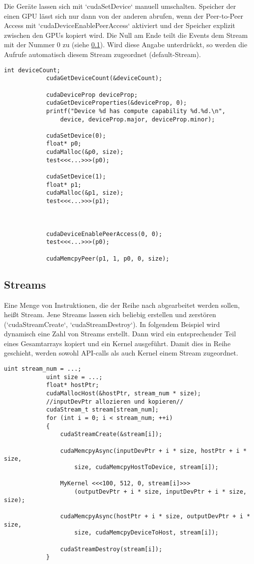 		Die Geräte lassen sich mit \li`cudaSetDevice` manuell umschalten. Speicher der einen GPU lässt sich nur dann von der anderen abrufen, wenn der Peer-to-Peer Access mit \li`cudaDeviceEnablePeerAccess` aktiviert und der Speicher explizit zwischen den GPUs kopiert wird. Die Null am Ende teilt die Events dem Stream mit der Nummer 0 zu (siehe \ref{streams}). Wird diese Angabe unterdrückt, so werden die Aufrufe automatisch diesem \Gls{Stream} zugeordnet (default-\Gls{Stream}).
		\begin{lstlisting}[caption=~Device Peer-to-Peer Access]
			int deviceCount;
			cudaGetDeviceCount(&deviceCount);

			cudaDeviceProp deviceProp;
			cudaGetDeviceProperties(&deviceProp, 0);
			printf("Device %d has compute capability %d.%d.\n",
    			device, deviceProp.major, deviceProp.minor);
           
			cudaSetDevice(0);
			float* p0;
			cudaMalloc(&p0, size);
			test<<<...>>>(p0);
			
			cudaSetDevice(1);
			float* p1;
			cudaMalloc(&p1, size);
			test<<<...>>>(p1);
			
			
			
			cudaDeviceEnablePeerAccess(0, 0);
			test<<<...>>>(p0);
			
			cudaMemcpyPeer(p1, 1, p0, 0, size);
		\end{lstlisting}

	
		\subsection{Streams}\label{streams}
		Eine Menge von Instruktionen, die der Reihe nach abgearbeitet werden sollen, heißt \Gls{Stream}. Jene \Glspl{Stream} lassen sich beliebig erstellen und zerstören (\li`cudaStreamCreate`, \li`cudaStreamDestroy`). In folgendem Beispiel wird dynamisch eine Zahl von \Glspl{Stream} erstellt. Dann wird ein entsprechender Teil eines Gesamtarrays kopiert und ein Kernel ausgeführt. Damit dies in Reihe geschieht, werden sowohl \Gls{API}-calls als auch \Gls{Kernel} einem \Gls{Stream} zugeordnet.	
		
		\newpage
		
		\begin{lstlisting}[caption=~Streams]
			uint stream_num = ...;
			uint size = ...;	    
			float* hostPtr;
			cudaMallocHost(&hostPtr, stream_num * size);	
			//inputDevPtr allozieren und kopieren//
			cudaStream_t stream[stream_num];
			for (int i = 0; i < stream_num; ++i)
			{
				cudaStreamCreate(&stream[i]);
    			
				cudaMemcpyAsync(inputDevPtr + i * size, hostPtr + i * size,
					size, cudaMemcpyHostToDevice, stream[i]);
    			
				MyKernel <<<100, 512, 0, stream[i]>>>
					(outputDevPtr + i * size, inputDevPtr + i * size, size);
				
				cudaMemcpyAsync(hostPtr + i * size, outputDevPtr + i * size,
					size, cudaMemcpyDeviceToHost, stream[i]);
								
				cudaStreamDestroy(stream[i]);
			}
		\end{lstlisting}

